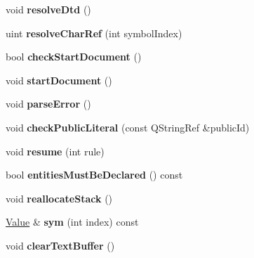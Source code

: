\begin{DoxyCompactItemize}
void {\bfseries resolve\+Dtd} ()
\item 
\mbox{\label{class_xml_stream_reader_private_aedca0b109be7991da98a21d5f00ba963}} 
uint {\bfseries resolve\+Char\+Ref} (int symbol\+Index)
\item 
\mbox{\label{class_xml_stream_reader_private_a6351acd49c18ff348a0dd3bb6154d910}} 
bool {\bfseries check\+Start\+Document} ()
\item 
\mbox{\label{class_xml_stream_reader_private_a0508b11ee32b33d947c4bec596a58b5b}} 
void {\bfseries start\+Document} ()
\item 
\mbox{\label{class_xml_stream_reader_private_a4eb2a688d17d8e74ff9497bbe7a9dcb6}} 
void {\bfseries parse\+Error} ()
\item 
\mbox{\label{class_xml_stream_reader_private_a4583f8ad5d190e622b30a2405c76c92d}} 
void {\bfseries check\+Public\+Literal} (const Q\+String\+Ref \&public\+Id)
\item 
\mbox{\label{class_xml_stream_reader_private_a958aa4a7ccbf1e9aa23d0abb9bcc29cf}} 
void {\bfseries resume} (int rule)
\item 
\mbox{\label{class_xml_stream_reader_private_a0c1ed98e8bc930f0426e0d284e6b98d1}} 
bool {\bfseries entities\+Must\+Be\+Declared} () const
\item 
\mbox{\label{class_xml_stream_reader_private_af3aaadd315f7648993df29b87e11b733}} 
void {\bfseries reallocate\+Stack} ()
\item 
\mbox{\label{class_xml_stream_reader_private_a2941f6d11f7aa71e50cd3cc5d7b35ab8}} 
\hyperlink{struct_xml_stream_reader_private_1_1_value}{Value} \& {\bfseries sym} (int index) const
\item 
\mbox{\label{class_xml_stream_reader_private_a668af1f7a5cc8d7c6b5c5c62d1cf3216}} 
void {\bfseries clear\+Text\+Buffer} ()

\end{DoxyCompactItemize}
